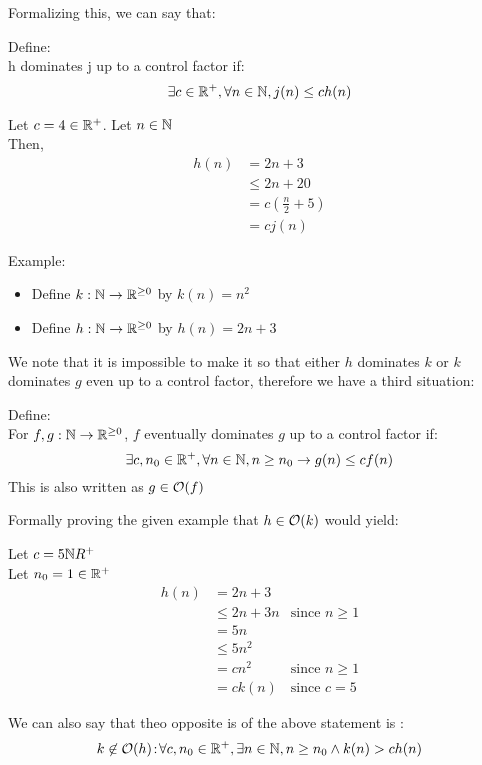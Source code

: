 \documentclass[12pt, letterpaper, twoside]{article}
\begin{document}
Formalizing this, we can say that:

Define:\\
h dominates j up to a control factor if:
$$
\exists c \in \mathbb R^+, \forall n \in \mathbb N, j(n) \le ch(n)
$$
\begin{aproof}
    Let $c = 4 \in \mathbb R^+$. Let $n \in \mathbb N$\\
    Then,
    \begin{align*}
        h(n) &= 2n + 3\\
        &\le 2n + 20\\
        &= c(\frac{n}{2} + 5)\\
        &= cj(n)
    \end{align*}
\end{aproof}

Example:
\begin{itemize}
    \item Define $k: \mathbb N \to \mathbb R^{\ge 0}$ by $k(n) = n^2$
    \item Define $h: \mathbb N \to \mathbb R^{\ge 0}$ by $h(n) = 2n + 3$
\end{itemize}
We note that it is impossible to make it so that either $h$ dominates $k$ or $k$
dominates $g$ even up to a control factor, therefore we have a third situation:

Define:\\
For $f, g: \mathbb N \to \mathbb R^{\ge 0}$, $f$ eventually dominates $g$ up to a control factor if:
    $$
        \exists c, n_0 \in \mathbb R^+, \forall n \in \mathbb N, n \ge n_0 \to g(n) \le cf(n)
    $$
This is also written as $g \in \mathcal O(f)$

Formally proving the given example that $h \in \mathcal O(k)$ would yield:
\begin{aproof}
    Let $c = 5 \mathbb N R^+$\\
    Let $n_0 = 1 \in \mathbb R^+$\\
    \begin{align*}
        h(n) &= 2n+3\\
        &\le 2n + 3n &\text{since }n \ge 1\\
        &= 5n\\ 
        &\le 5n^2 \\
        &= cn^2 &\text{since }n \ge 1\\
        &= ck(n) &\text{since }c = 5
    \end{align*}
\end{aproof}

We can also say that theo opposite is of the above statement is :
$$k \not\in \mathcal O(h) \! : \! \forall c, n_0 \in \mathbb R^+, \exists n \in \mathbb N, n \ge n_0 \land k(n) > ch(n)$$
\end{document}
